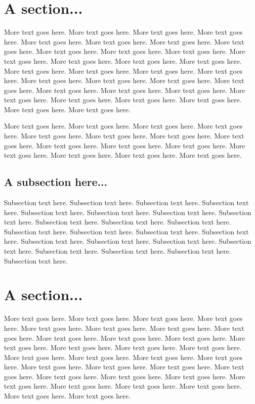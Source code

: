 \documentclass{chi-ext}
\begin{document}
\section{A section...}
More text goes here. More text goes here. More text goes here. More
text goes here. More text goes here. More text goes here. More text
goes here. More text goes here. More text goes here. More text goes
here. More text goes here. More text goes here. More text goes
here. More text goes here. More text goes here. More text goes
here. More text goes here. More text goes here. More text goes
here. More text goes here. More text goes here. More text goes
here. More text goes here. More text goes here. More text goes
here. More text goes here. More text goes here. More text goes
here. More text goes here. More text goes here. More text goes
here. More text goes here.

More text goes here. More text goes here. More text goes here. More
text goes here. More text goes here. More text goes here. More text
goes here. More text goes here. More text goes here. More text goes
here. More text goes here. More text goes here. More text goes
here. More text goes here. More text goes here.

\subsection{A subsection here...}
Subsection text here. Subsection text here. Subsection text
here. Subsection text here. Subsection text here. Subsection text
here. Subsection text here. Subsection text here. Subsection text
here. Subsection text here. Subsection text here. Subsection text
here. Subsection text here. Subsection text here. Subsection text
here. Subsection text here. Subsection text here. Subsection text
here. Subsection text here. Subsection text here. Subsection text
here. Subsection text here. Subsection text here.

\section{A section...}
More text goes here. More text goes here. More text goes here. More
text goes here. More text goes here. More text goes here. More text
goes here. More text goes here. More text goes here. More text goes
here. More text goes here. More text goes here. More text goes
here. More text goes here. More text goes here. More text goes
here. More text goes here. More text goes here. More text goes
here. More text goes here. More text goes here. More text goes
here. More text goes here. More text goes here. More text goes
here. More text goes here. More text goes here. More text goes
here. More text goes here. More text goes here. More text goes
here. More text goes here.
\end{document}
